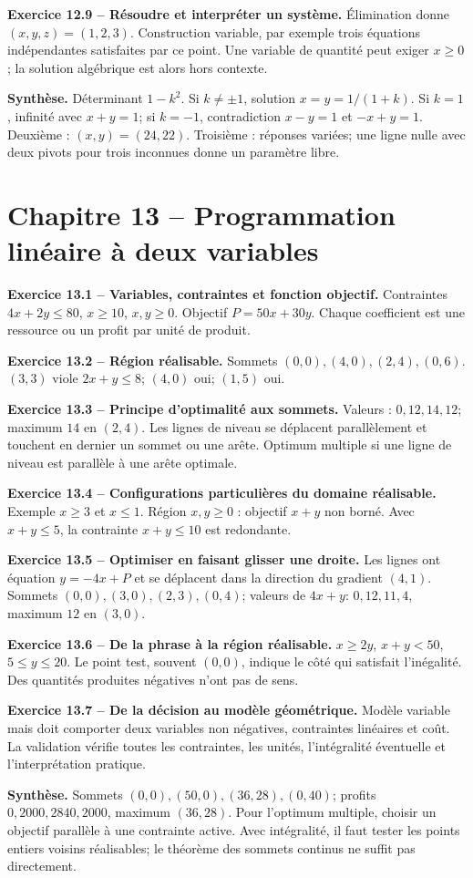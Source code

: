 \documentclass[11pt,a4paper,openany]{book}
\begin{document}
\begin{answerbox}
\textbf{Exercice 12.9 -- Résoudre et interpréter un système.} Élimination donne $(x,y,z)=(1,2,3)$. Construction variable, par exemple trois équations indépendantes satisfaites par ce point. Une variable de quantité peut exiger $x\ge0$; la solution algébrique est alors hors contexte.\par
\medskip\textbf{Synthèse.} Déterminant $1-k^2$. Si $k\neq\pm1$, solution $x=y=1/(1+k)$. Si $k=1$, infinité avec $x+y=1$; si $k=-1$, contradiction $x-y=1$ et $-x+y=1$. Deuxième : $(x,y)=(24,22)$. Troisième : réponses variées; une ligne nulle avec deux pivots pour trois inconnues donne un paramètre libre.
\end{answerbox}
\chapter*{Chapitre 13 -- Programmation linéaire à deux variables}
\begin{answerbox}
\textbf{Exercice 13.1 -- Variables, contraintes et fonction objectif.} Contraintes $4x+2y\le80$, $x\ge10$, $x,y\ge0$. Objectif $P=50x+30y$. Chaque coefficient est une ressource ou un profit par unité de produit.\par
\textbf{Exercice 13.2 -- Région réalisable.} Sommets $(0,0),(4,0),(2,4),(0,6)$. $(3,3)$ viole $2x+y\le8$; $(4,0)$ oui; $(1,5)$ oui.\par
\textbf{Exercice 13.3 -- Principe d'optimalité aux sommets.} Valeurs : $0,12,14,12$; maximum $14$ en $(2,4)$. Les lignes de niveau se déplacent parallèlement et touchent en dernier un sommet ou une arête. Optimum multiple si une ligne de niveau est parallèle à une arête optimale.\par
\textbf{Exercice 13.4 -- Configurations particulières du domaine réalisable.} Exemple $x\ge3$ et $x\le1$. Région $x,y\ge0$ : objectif $x+y$ non borné. Avec $x+y\le5$, la contrainte $x+y\le10$ est redondante.\par
\textbf{Exercice 13.5 -- Optimiser en faisant glisser une droite.} Les lignes ont équation $y=-4x+P$ et se déplacent dans la direction du gradient $(4,1)$. Sommets $(0,0),(3,0),(2,3),(0,4)$; valeurs de $4x+y$: $0,12,11,4$, maximum $12$ en $(3,0)$.\par
\textbf{Exercice 13.6 -- De la phrase à la région réalisable.} $x\ge2y$, $x+y<50$, $5\le y\le20$. Le point test, souvent $(0,0)$, indique le côté qui satisfait l'inégalité. Des quantités produites négatives n'ont pas de sens.\par
\textbf{Exercice 13.7 -- De la décision au modèle géométrique.} Modèle variable mais doit comporter deux variables non négatives, contraintes linéaires et coût. La validation vérifie toutes les contraintes, les unités, l'intégralité éventuelle et l'interprétation pratique.\par
\medskip\textbf{Synthèse.} Sommets $(0,0),(50,0),(36,28),(0,40)$; profits $0,2000,2840,2000$, maximum $(36,28)$. Pour l'optimum multiple, choisir un objectif parallèle à une contrainte active. Avec intégralité, il faut tester les points entiers voisins réalisables; le théorème des sommets continus ne suffit pas directement.
\end{answerbox}
\end{document}
